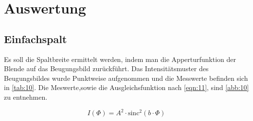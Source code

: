 \section{Auswertung}
\subsection{Einfachspalt}
Es soll die Spaltbreite ermittelt werden, indem man die Apperturfunktion der Blende auf das 
Beugungsbild zurückführt. Das Intensitätsmuster des Beugungsbildes wurde Punktweise aufgenommen und 
die Messwerte befinden sich in \autoref{tab:10}. Die Meswerte,sowie die Ausgleichsfunktion nach \autoref{eqn:11},
sind \autoref{abb:10} zu entnehmen.

\begin{equation}
    \label{eqn:11}
    I\left(\Phi\right) = A^2 \cdot \text{sinc}^2\left(b \cdot \Phi\right) 
\end{equation}


